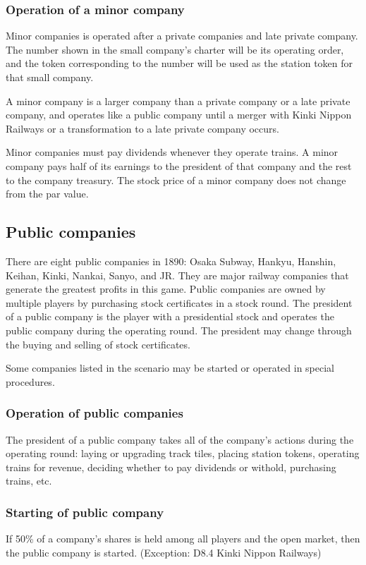 \documentclass{article}
\begin{document}
\begin{CJK}{UTF8}{min}
\begin{multicols}{2}
\subsubsection{Operation of a minor company}
Minor companies is operated after a private companies and late private
company. The number shown in the small company's charter will be its
operating order, and the token corresponding to the number will be
used as the station token for that small company.

A minor company is a larger company than a private company or a late
private company, and operates like a public company until a merger
with Kinki Nippon Railways or a transformation to a late private
company occurs.

Minor companies must pay dividends whenever they operate trains. A
minor company pays half of its earnings to the president of that
company and the rest to the company treasury. The stock price of a
minor company does not change from the par value.

\subsection{Public companies}
There are eight public companies in 1890: Osaka Subway, Hankyu,
Hanshin, Keihan, Kinki, Nankai, Sanyo, and JR. They are major railway
companies that generate the greatest profits in this game. Public
companies are owned by multiple players by purchasing stock
certificates in a stock round. The president of a public company is
the player with a presidential stock and operates the public company
during the operating round. The president may change through the buying
and selling of stock certificates.

Some companies listed in the scenario may be started or operated
in special procedures.

\subsubsection{Operation of public companies}
The president of a public company takes all of the company's actions
during the operating round: laying or upgrading track tiles, placing
station tokens, operating trains for revenue, deciding whether to pay
dividends or withold, purchasing trains, etc.

\subsubsection{Starting of public company}
If 50\% of a company's shares is held among all players and the open
market, then the public company is started. (Exception: D8.4 Kinki
Nippon Railways)


\end{multicols}
\end{CJK}
\end{document}
